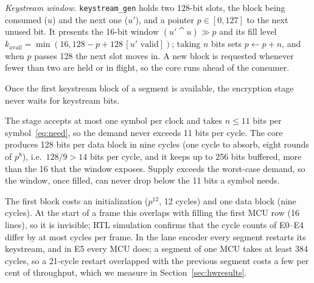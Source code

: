\textit{Keystream window.} \texttt{keystream\_gen} holds two 128-bit slots, the block being consumed ($u$) and the next one ($u'$), and a pointer $p \in [0, 127]$ to the next unused bit. It presents the 16-bit window $(u' \cat u) \gg p$ and its fill level $k_{\mathrm{avail}} = \min(16, 128 - p + 128\,[u' \text{ valid}])$; taking $n$ bits sets $p \leftarrow p + n$, and when $p$ passes 128 the next slot moves in. A new block is requested whenever fewer than two are held or in flight, so the core runs ahead of the consumer.

\begin{proposition}\label{prop:supply}
Once the first keystream block of a segment is available, the encryption stage never waits for keystream bits.
\end{proposition}
\begin{IEEEproof}
The stage accepts at most one symbol per clock and takes $n \le 11$ bits per symbol~\eqref{eq:need}, so the demand never exceeds 11 bits per cycle. The core produces 128 bits per data block in nine cycles (one cycle to absorb, eight rounds of $p^8$), i.e.\ $128/9 > 14$ bits per cycle, and it keeps up to 256 bits buffered, more than the 16 that the window exposes. Supply exceeds the worst-case demand, so the window, once filled, can never drop below the 11 bits a symbol needs.
\end{IEEEproof}
The first block costs an initialization ($p^{12}$, 12 cycles) and one data block (nine cycles). At the start of a frame this overlaps with filling the first MCU row (16 lines), so it is invisible; RTL simulation confirms that the cycle counts of E0--E4 differ by at most \MaxExtraCycles{} cycles per frame. In the lane encoder every segment restarts its keystream, and in E5 every MCU does; a segment of one MCU takes at least 384 cycles, so a 21-cycle restart overlapped with the previous segment costs a few per cent of throughput, which we measure in Section~\ref{sec:hwresults}.

